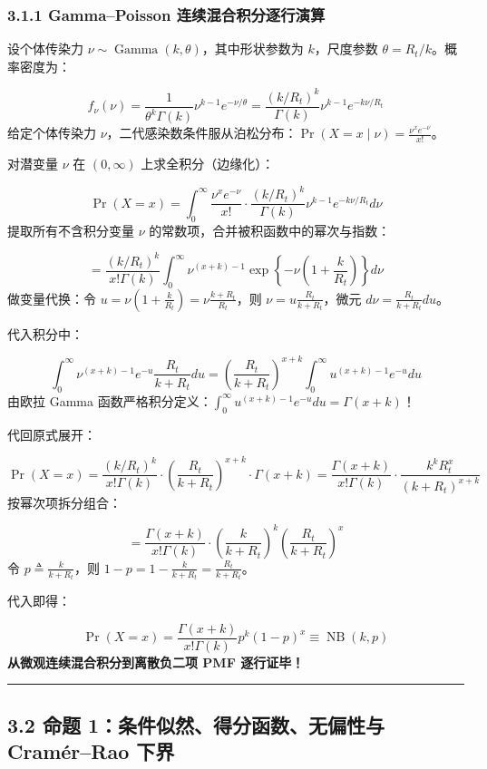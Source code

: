 \documentclass[11pt,a4paper]{ctexart}
\begin{document}
\subsubsection{3.1.1 Gamma–Poisson 连续混合积分逐行演算}
设个体传染力 $\nu \sim \operatorname{Gamma}(k, \theta)$，其中形状参数为 $k$，尺度参数 $\theta = R_t/k$。概率密度为：

\[
f_\nu(\nu) = \frac{1}{\theta^k \Gamma(k)} \nu^{k-1} e^{-\nu/\theta} = \frac{(k/R_t)^k}{\Gamma(k)} \nu^{k-1} e^{-k\nu / R_t}
\]
给定个体传染力 $\nu$，二代感染数条件服从泊松分布：$\Pr(X = x \mid \nu) = \frac{\nu^x e^{-\nu}}{x!}$。

对潜变量 $\nu$ 在 $(0, \infty)$ 上求全积分（边缘化）：

\[
\Pr(X = x) = \int_0^\infty \frac{\nu^x e^{-\nu}}{x!} \cdot \frac{(k/R_t)^k}{\Gamma(k)} \nu^{k-1} e^{-k\nu / R_t} d\nu
\]
提取所有不含积分变量 $\nu$ 的常数项，合并被积函数中的幂次与指数：

\[
= \frac{(k/R_t)^k}{x! \Gamma(k)} \int_0^\infty \nu^{(x+k)-1} \exp\left\{ -\nu \left(1 + \frac{k}{R_t}\right) \right\} d\nu
\]
做变量代换：令 $u = \nu \left(1 + \frac{k}{R_t}\right) = \nu \frac{k + R_t}{R_t}$，则 $\nu = u \frac{R_t}{k + R_t}$，微元 $d\nu = \frac{R_t}{k + R_t} du$。

代入积分中：

\[
\int_0^\infty \nu^{(x+k)-1} e^{-u} \frac{R_t}{k + R_t} du = \left(\frac{R_t}{k + R_t}\right)^{x+k} \int_0^\infty u^{(x+k)-1} e^{-u} du
\]
由欧拉 Gamma 函数严格积分定义：$\int_0^\infty u^{(x+k)-1} e^{-u} du = \Gamma(x+k)$！

代回原式展开：

\[
\Pr(X = x) = \frac{(k/R_t)^k}{x! \Gamma(k)} \cdot \left(\frac{R_t}{k + R_t}\right)^{x+k} \cdot \Gamma(x+k) = \frac{\Gamma(x+k)}{x! \Gamma(k)} \cdot \frac{k^k R_t^x}{(k + R_t)^{x+k}}
\]
按幂次项拆分组合：

\[
= \frac{\Gamma(x+k)}{x! \Gamma(k)} \cdot \left(\frac{k}{k + R_t}\right)^k \left(\frac{R_t}{k + R_t}\right)^x
\]
令 $p \triangleq \frac{k}{k + R_t}$，则 $1 - p = 1 - \frac{k}{k + R_t} = \frac{R_t}{k + R_t}$。

代入即得：

\[
\Pr(X = x) = \frac{\Gamma(x+k)}{x! \Gamma(k)} p^k (1 - p)^x \equiv \operatorname{NB}(k, p)
\]
\textbf{从微观连续混合积分到离散负二项 PMF 逐行证毕！}


\vspace{0.8em}\hrule\vspace{0.8em}

\subsection{3.2 命题 1：条件似然、得分函数、无偏性与 Cramér–Rao 下界}
\end{document}
